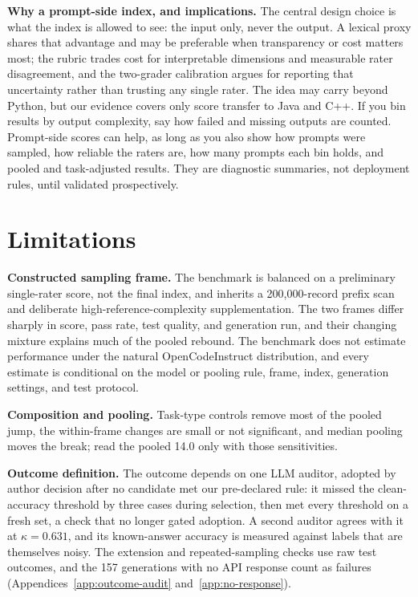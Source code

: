 \documentclass{article}
\begin{document}
\textbf{Why a prompt-side index, and implications.} The central design choice is what the index is allowed to see: the input only, never the output. A lexical proxy shares that advantage and may be preferable when transparency or cost matters most; the rubric trades cost for interpretable dimensions and measurable rater disagreement, and the two-grader calibration argues for reporting that uncertainty rather than trusting any single rater. The idea may carry beyond Python, but our evidence covers only score transfer to Java and C++. If you bin results by output complexity, say how failed and missing outputs are counted. Prompt-side scores can help, as long as you also show how prompts were sampled, how reliable the raters are, how many prompts each bin holds, and pooled and task-adjusted results. They are diagnostic summaries, not deployment rules, until validated prospectively.

\section{Limitations}
\label{sec:limitations}

\textbf{Constructed sampling frame.} The benchmark is balanced on a preliminary single-rater score, not the final index, and inherits a 200{,}000-record prefix scan and deliberate high-reference-complexity supplementation. The two frames differ sharply in score, pass rate, test quality, and generation run, and their changing mixture explains much of the pooled rebound. The benchmark does not estimate performance under the natural OpenCodeInstruct distribution, and every estimate is conditional on the model or pooling rule, frame, index, generation settings, and test protocol.

\textbf{Composition and pooling.} Task-type controls remove most of the pooled jump, the within-frame changes are small or not significant, and median pooling moves the break; read the pooled 14.0 only with those sensitivities.

\textbf{Outcome definition.} The outcome depends on one LLM auditor, adopted by author decision after no candidate met our pre-declared rule: it missed the clean-accuracy threshold by three cases during selection, then met every threshold on a fresh set, a check that no longer gated adoption. A second auditor agrees with it at $\kappa=0.631$, and its known-answer accuracy is measured against labels that are themselves noisy. The extension and repeated-sampling checks use raw test outcomes, and the 157 generations with no API response count as failures (Appendices~\ref{app:outcome-audit} and~\ref{app:no-response}).
\end{document}
